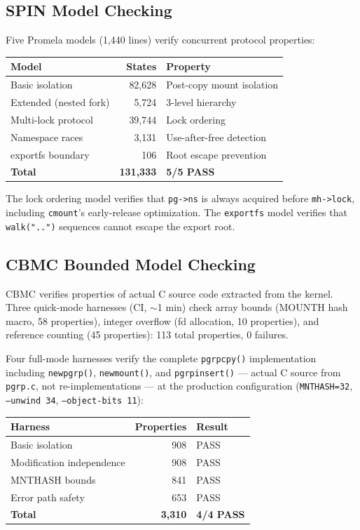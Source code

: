 \documentclass[acmsmall,screen,review]{acmart}
\begin{document}
\subsection{SPIN Model Checking}

Five Promela models (1,440 lines) verify concurrent protocol properties:

\begin{center}
\small
\begin{tabular}{p{3.2cm}rl}
\textbf{Model} & \textbf{States} & \textbf{Property} \\
\hline
Basic isolation & 82,628 & Post-copy mount isolation \\
Extended (nested fork) & 5,724 & 3-level hierarchy \\
Multi-lock protocol & 39,744 & Lock ordering \\
Namespace races & 3,131 & Use-after-free detection \\
exportfs boundary & 106 & Root escape prevention \\
\hline
\textbf{Total} & \textbf{131,333} & \textbf{5/5 PASS} \\
\end{tabular}
\end{center}

The lock ordering model verifies that \texttt{pg->ns} is always acquired before
\texttt{mh->lock}, including \texttt{cmount}'s early-release optimization. The
\texttt{exportfs} model verifies that \texttt{walk("..")} sequences cannot escape the
export root.


\subsection{CBMC Bounded Model Checking}

CBMC verifies properties of actual C source code extracted from the kernel.
Three quick-mode harnesses (CI, $\sim$1 min) check array bounds (MOUNTH hash macro,
58 properties), integer overflow (fd allocation, 10 properties), and reference
counting (45 properties): 113 total properties, 0 failures.

Four full-mode harnesses verify the complete \texttt{pgrpcpy()} implementation
including \texttt{newpgrp()}, \texttt{newmount()}, and \texttt{pgrpinsert()} ---
actual C source from \texttt{pgrp.c}, not re-implementations --- at the production
configuration (\texttt{MNTHASH=32}, \texttt{--unwind 34}, \texttt{--object-bits 11}):

\begin{center}
\small
\begin{tabular}{p{3.8cm}rl}
\textbf{Harness} & \textbf{Properties} & \textbf{Result} \\
\hline
Basic isolation & 908 & PASS \\
Modification independence & 908 & PASS \\
MNTHASH bounds & 841 & PASS \\
Error path safety & 653 & PASS \\
\hline
\textbf{Total} & \textbf{3,310} & \textbf{4/4 PASS} \\
\end{tabular}
\end{center}
\end{document}
